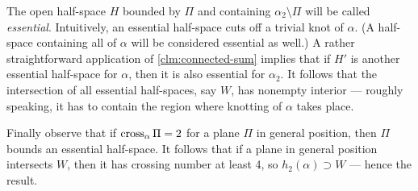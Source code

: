 The open half-space $H$ bounded by $\Pi$ and containing $\alpha_2\setminus\Pi$ will be called \emph{essential}. Intuitively, an essential half-space cuts off
a trivial knot of $\alpha$. (A half-space containing all of $\alpha$ will be considered essential as well.)
A rather straightforward application of \ref{clm:connected-sum} implies that if $H'$ is another essential half-space for $\alpha$, then it is also essential for $\alpha_2$.
It follows that the intersection of all essential half-spaces, say $W$, has  nonempty interior --- roughly speaking, it has to contain the region where knotting of $\alpha$ takes place.

Finally observe that if $\mathop{\rm cross}\nolimits_\alpha\Pi=2$ for a plane $\Pi$ in general position, then $\Pi$ bounds an essential half-space. 
It follows that if a plane in general position intersects $W$, then it has  crossing number at least 4,
so $h_2(\alpha)\supset W$ --- hence the result.
\qeds

